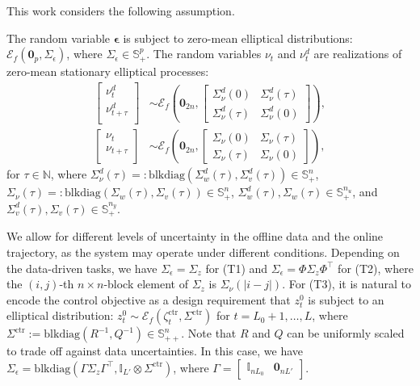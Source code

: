 \documentclass{ifacconf}
\newcommand{\blkdiag}[1]{\mathrm{blkdiag}\left(#1\right)}
\newcommand{\ellip}[1]{\mathcal{E}_f\left(#1\right)}
\begin{document}
This work considers the following assumption.
\begin{assum}
     The random variable $\boldsymbol{\epsilon}$ is subject to zero-mean elliptical distributions: $\ellip{\mathbf{0}_p,\Sigma_\epsilon}$, where $\Sigma_\epsilon\in\mathbb{S}_+^p$. The random variables $\nu_t$ and $\nu_t^d$ are realizations of zero-mean stationary elliptical processes:
    \begin{align}
        \begin{bmatrix}
            \nu_t^d\\
            \nu_{t+\tau}^d\\
        \end{bmatrix}
        &\sim\ellip{\mathbf{0}_{2n},
        \begin{bmatrix}
            \Sigma_\nu^d(0)&\Sigma_\nu^d(\tau)\\
            \Sigma_\nu^d(\tau)&\Sigma_\nu^d(0)
        \end{bmatrix}
        },\\
        \begin{bmatrix}
            \nu_t\\
            \nu_{t+\tau}\\
        \end{bmatrix}
        &\sim\ellip{\mathbf{0}_{2n},
        \begin{bmatrix}
            \Sigma_\nu(0)&\Sigma_\nu(\tau)\\
            \Sigma_\nu(\tau)&\Sigma_\nu(0)
        \end{bmatrix}
        },
    \end{align}
    for $\tau\in\mathbb{N}$, where $\Sigma_\nu^d(\tau)=:\blkdiag{\Sigma_w^d(\tau),\Sigma_v^d(\tau)}\in\mathbb{S}_+^n$, $\Sigma_\nu(\tau)=:\blkdiag{\Sigma_w(\tau),\Sigma_v(\tau)}\in\mathbb{S}_+^n$, $\Sigma_w^d(\tau),\Sigma_w(\tau)\in\mathbb{S}_+^{n_u}$, and $\Sigma_v^d(\tau),\Sigma_v(\tau)\in\mathbb{S}_+^{n_y}$.
\end{assum}
We allow for different levels of uncertainty in the offline data and the online trajectory, as the system may operate under different conditions.
Depending on the data-driven tasks, we have $\Sigma_\epsilon=\Sigma_z$ for (T1) and $\Sigma_\epsilon=\Phi\Sigma_z\Phi^\top$ for (T2), where the $(i,j)$-th $n\times n$-block element of $\Sigma_z$ is $\Sigma_\nu(|i-j|)$. For
(T3), it is natural to encode the control objective as a design requirement that $z_t^0$ is subject to an elliptical distribution: $z_t^0\sim\ellip{\zeta_t^\mathrm{ctr},\Sigma^\mathrm{ctr}}$ for $t=L_0+1,\dots,L$, where $\Sigma^\mathrm{ctr}:=\blkdiag{R^{-1},Q^{-1}}\in\mathbb{S}_{++}^n$. Note that $R$ and $Q$ can be uniformly scaled to trade off against data uncertainties. In this case, we have $\Sigma_\epsilon=\blkdiag{\Gamma\Sigma_z\Gamma^\top,\mathbb{I}_{L'}\otimes\Sigma^\mathrm{ctr}}$, where $\Gamma=\begin{bmatrix}
    \mathbb{I}_{nL_0}&\mathbf{0}_{nL'}
\end{bmatrix}$.
\end{document}
